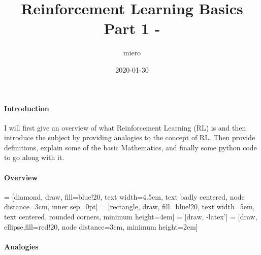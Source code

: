 \documentclass[]{article}
\title{Reinforcement Learning Basics Part 1 -}
\author{miero}
\date{2020-01-30}
\let\oldparagraph\paragraph
\renewcommand{\paragraph}[1]{\oldparagraph{#1}\mbox{}}
\begin{document}
\maketitle

\hypertarget{introduction}{%
\paragraph{Introduction}\label{introduction}}

I will first give an overview of what Reinforcement Learning (RL) is and
then introduce the subject by providing analogies to the concept of RL.
Then provide definitions, explain some of the basic Mathematics, and
finally some python code to go along with it.

\hypertarget{overview}{%
\paragraph{Overview}\label{overview}}

 = {[}diamond, draw, fill=blue!20, text width=4.5em,
text badly centered, node distance=3cm, inner sep=0pt{]}
 = {[}rectangle, draw, fill=blue!20, text width=5em,
text centered, rounded corners, minimum height=4em{]}  =
{[}draw, -latex'{]}  = {[}draw, ellipse,fill=red!20,
node distance=3cm, minimum height=2em{]}


\hypertarget{analogies}{%
\paragraph{Analogies}\label{analogies}}
\end{document}
